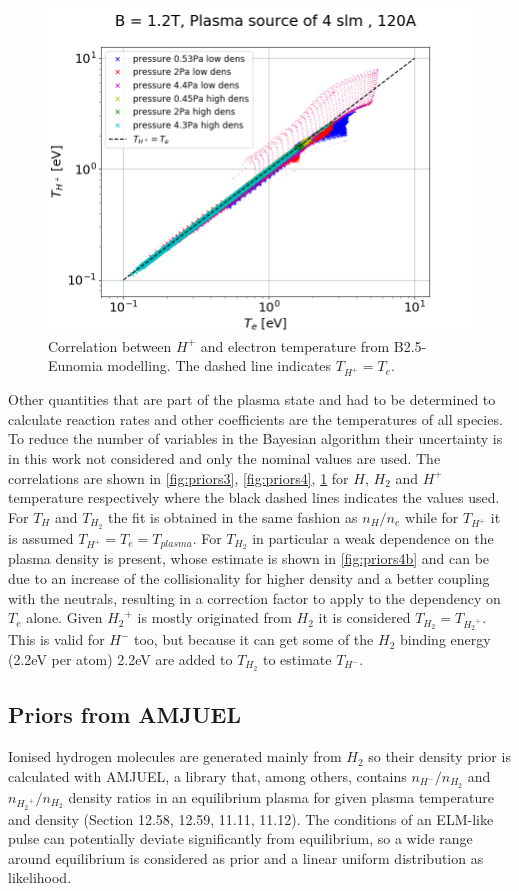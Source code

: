 \begin{figure}[!ht]
	\centering
	\includegraphics[width=0.7\linewidth,trim={0 0 30 45},clip]{Chapters/chapter3/figs/THp_Te3.png}
	\caption{Correlation between $H^+$ and electron temperature from B2.5-Eunomia modelling. The dashed line indicates $T_{H^+}=T_e$.}
	\label{fig:priors5}
\end{figure}

Other quantities that are part of the plasma state and had to be determined to calculate reaction rates and other coefficients are the temperatures of all species. To reduce the number of variables in the Bayesian algorithm their uncertainty is in this work not considered and only the nominal values are used. The correlations are shown in \autoref{fig:priors3}, \ref{fig:priors4}, \ref{fig:priors5} for $H$, $H_2$ and $H^+$ temperature respectively where the black dashed lines indicates the values used. For $T_H$ and $T_{H_2}$ the fit is obtained in the same fashion as $n_H/n_e$ while for $T_{H^+}$ it is assumed $T_{H^+}=T_e=T_{plasma}$. For $T_{H_2}$ in particular a weak dependence on the plasma density is present, whose estimate is shown in \autoref{fig:priors4b} and can be due to an increase of the collisionality for higher density and a better coupling with the neutrals, resulting in a correction factor to apply to the dependency on $T_e$ alone. Given ${H_2}^+$ is mostly originated from $H_2$ it is considered $T_{H_2}=T_{{H_2}^+}$. This is valid for $H^-$ too, but because it can get some of the $H_2$ binding energy (2.2eV per atom) 2.2eV are added to $T_{H_2}$ to estimate $T_{H^-}$.\cite{Verhaegh2020}


\subsection{Priors from AMJUEL}\label{Priors from AMJUEL}
Ionised hydrogen molecules are generated mainly from $H_2$ so their density prior is calculated with AMJUEL\cite{Reiter2017}, a library that, among others, contains $n_{H^-}/n_{H_2}$ and $n_{{H_2}^+}/n_{H_2}$ density ratios in an equilibrium plasma for given plasma temperature and density (Section 12.58, 12.59, 11.11, 11.12). The conditions of an ELM-like pulse can potentially deviate significantly from equilibrium, so a wide range around equilibrium is considered as prior and a linear uniform distribution as likelihood.



